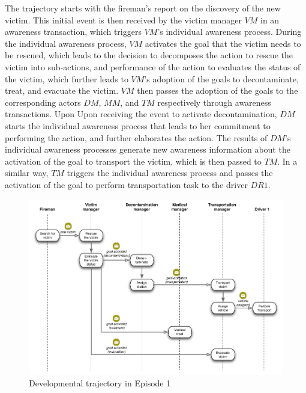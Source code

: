 The trajectory starts with the fireman's report on the discovery of the new victim. This initial event is then received by the victim manager $VM$ in an awareness transaction, which triggers $VM$'s individual awareness process. During the individual awareness process, $VM$ activates the goal that the victim needs to be rescued, which leads to the decision to decomposes the action to rescue the victim into sub-actions, and performance of the action to evaluates the status of the victim, which further leads to $VM$'s adoption of the goals to decontaminate, treat, and evacuate the victim. $VM$ then passes the adoption of the goals to the corresponding actors $DM$, $MM$, and $TM$ respectively through awareness transactions. Upon Upon receiving the event to activate decontamination, $DM$ starts the individual awareness process that leads to her commitment to performing the action, and further elaborates the action. The results of $DM$'s individual awareness processes generate new awareness information about the activation of the goal to transport the victim, which is then passed to $TM$. In a similar way, $TM$ triggers the individual awareness process and passes the activation of the goal to perform transportation task to the driver $DR1$.

\begin{figure}[htbp] %
   \centering
   \includegraphics[width=5.8in]{episode_1_interaction.pdf} 
   \caption{Developmental trajectory in Episode 1}
   \label{fig:episode_1_interaction}
\end{figure}

